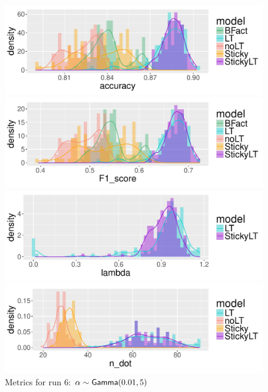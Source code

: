 \begin{figure}[tb]
  \centering
  \begin{minipage}{0.75\textwidth}
  \includegraphics[width = \textwidth]{fig/cocktail/synth_s16_m12/hyper_alpha/h10.0_nocs_cp0/a0p01b5/accuracy_density.pdf}
\end{minipage}

\begin{minipage}{0.75\textwidth}
  \includegraphics[width = \textwidth]{fig/cocktail/synth_s16_m12/hyper_alpha/h10.0_nocs_cp0/a0p01b5/F1_score_density.pdf}
\end{minipage}

\begin{minipage}{0.75\textwidth}
  \includegraphics[width = \textwidth]{fig/cocktail/synth_s16_m12/hyper_alpha/h10.0_nocs_cp0/a0p01b5/lambda_density.pdf}
\end{minipage}

\begin{minipage}{0.75\textwidth}
  \includegraphics[width = \textwidth]{fig/cocktail/synth_s16_m12/hyper_alpha/h10.0_nocs_cp0/a0p01b5/n_dot_density.pdf}
\end{minipage}
\caption{Metrics for run 6: $\alpha \sim \mathsf{Gamma}(0.01,5)$}
\end{figure}

